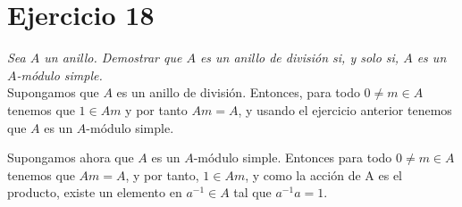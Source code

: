 \section{Ejercicio 18}%
\label{sec:ejercicio_18}
\textit{Sea \(A\) un anillo. Demostrar que \(A\) es un anillo de división si, y solo si, \(A\) es un \(A\)-módulo simple.}\\

Supongamos que \(A\) es un anillo de división. Entonces, para todo \(0 \neq m \in A\) tenemos que  \(1 \in Am\) y por tanto  \(Am = A\), y usando el ejercicio anterior tenemos que  \(A\) es un \(A\)-módulo simple.

Supongamos ahora que \(A\) es un \(A\)-módulo simple. Entonces para todo \( 0\neq m \in A\) tenemos que \(Am = A\), y por tanto, \(1 \in Am\), y como la acción de A es el producto, existe un elemento en  \(a^{-1} \in A\) tal que  \(a^{-1}a = 1\).
